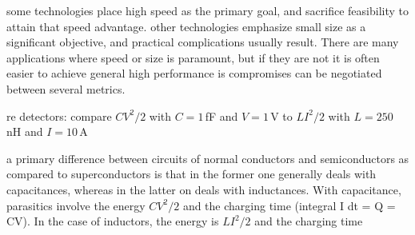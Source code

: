 \vspace{3em}
some technologies place high speed as the primary goal, and sacrifice feasibility to attain that speed advantage. other technologies emphasize small size as a significant objective, and practical complications usually result. There are many applications where speed or size is paramount, but if they are not it is often easier to achieve general high performance is compromises can be negotiated between several metrics.

\vspace{3em}
re detectors: compare $CV^2/2$ with $C = 1$\,fF and $V = 1$\,V to $LI^2/2$ with $L = 250$\,nH and $I = 10$\,\textmu A \cite{mi2009}

\vspace{3em}
a primary difference between circuits of normal conductors and semiconductors as compared to superconductors is that in the former one generally deals with capacitances, whereas in the latter on deals with inductances. With capacitance, parasitics involve the energy  $CV^2/2$ and the charging time (integral I dt = Q = CV). In the case of inductors, the energy is $LI^2/2$ and the charging time 

